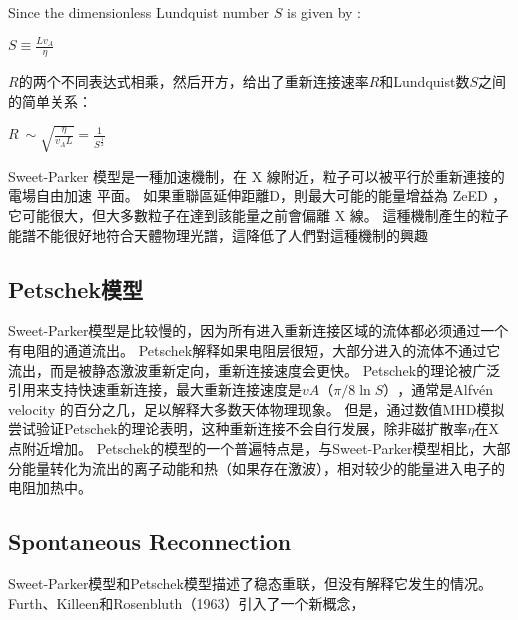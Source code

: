 \documentclass[12pt, a4paper, oneside]{article}
\begin{document}
\begin{spacing}{2.0}
Since the dimensionless Lundquist number $S$ is given by
: 
\begin{center}
    $\displaystyle S \equiv \frac{Lv_A}{\eta}$
\end{center}
$R$的两个不同表达式相乘，然后开方，给出了重新连接速率$R$和Lundquist数$S$之间的简单关系：
\begin{center}
    $\displaystyle R ~ \sim \sqrt{\frac{\eta}{v_A L}} = \frac{1}{S^\frac{1}{2}}$
\end{center}
Sweet-Parker 模型是一種加速機制，在 X 線附近，粒子可以被平行於重新連接的電場自由加速
平面。 如果重聯區延伸距離D，則最大可能的能量增益為 ZeED ，它可能很大，但大多數粒子在達到該能量之前會偏離 X 線。 
這種機制產生的粒子能譜不能很好地符合天體物理光譜，這降低了人們對這種機制的興趣\cite{zweibel2009magnetic}

\subsection{Petschek模型}
Sweet-Parker模型是比较慢的，因为所有进入重新连接区域的流体都必须通过一个有电阻的通道流出。
Petschek解释如果电阻层很短，大部分进入的流体不通过它流出，而是被静态激波重新定向，重新连接速度会更快。
Petschek的理论被广泛引用来支持快速重新连接，最大重新连接速度是$vA（π/8 \ln S）$，通常是Alfvén velocity 的百分之几，足以解释大多数天体物理现象。
但是，通过数值MHD模拟尝试验证Petschek的理论表明，这种重新连接不会自行发展，除非磁扩散率$\eta$在X点附近增加。
Petschek的模型的一个普遍特点是，与Sweet-Parker模型相比，大部分能量转化为流出的离子动能和热（如果存在激波），相对较少的能量进入电子的电阻加热中。

\subsection{Spontaneous Reconnection}
Sweet-Parker模型和Petschek模型描述了稳态重联，但没有解释它发生的情况。Furth、Killeen和Rosenbluth（1963）引入了一个新概念，


\end{spacing}
\end{document}
